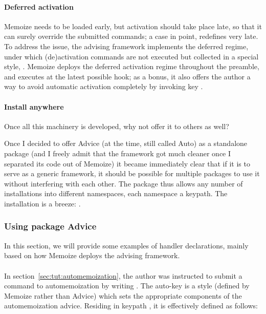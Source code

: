 \documentclass[a4paper,11pt]{article}
\begin{document}
\paragraph{Deferred activation}
Memoize needs to be loaded early, but activation should take place late, so
that it can surely override the submitted commands; a case in point,
 redefines  very late.  To address the issue, the
advising framework implements the deferred  regime, under
which (de)activation commands are not executed but collected in a special
style, .  Memoize deploys the deferred activation
regime throughout the preamble, and executes  at the
latest possible  hook; as a bonus, it also offers
the author a way to avoid automatic activation completely by invoking key
.


\paragraph{Install anywhere}
Once all this machinery is developed, why not offer it to others as well?

Once I decided to offer Advice (at the time, still called Auto) as a standalone
package (and I freely admit that the framework got much cleaner once I
separated its code out of Memoize) it became immediately clear that if it is
to serve as a generic framework, it should be possible for multiple packages to
use it without interfering with each other.  The package thus allows any number
of installations into different namespaces, each namespace a 
keypath.  The installation is a breeze:
.


\subsubsection{Using package Advice}
\label{sec:advice}

In this section, we will provide some examples of handler declarations, mainly
based on how Memoize deploys the advising framework.

\paragraph{}

In section~\ref{sec:tut:automemoization}, the author was instructed to submit a
command to automemoization by writing
.  The
auto-key  is a style (defined by Memoize rather than
Advice) which sets the appropriate components of the automemoization advice.
Residing in keypath , it is effectively defined as
follows:
\end{document}
